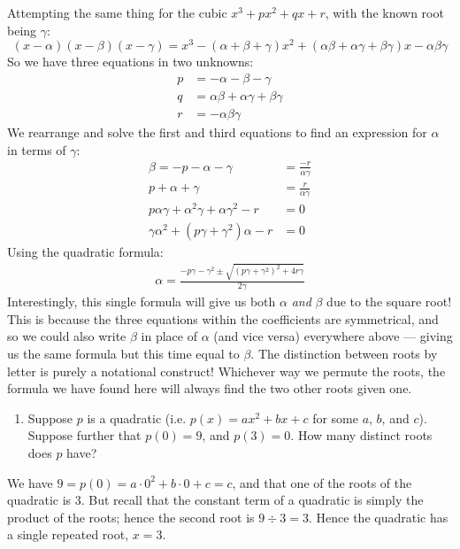 \documentclass[a4paper,10pt]{article}
\newcommand{\answer}{\bfseries\color{Emerald}\refstepcounter{enumi}\item[\theenumi.]}
\begin{document}
Attempting the same thing for the cubic $ x^3 + px^2 + qx + r $, with the known root being $ \gamma $:
\begin{displaymath}
  (x - \alpha)(x - \beta)(x - \gamma) = x^3 - (\alpha + \beta + \gamma)x^2 + (\alpha\beta + \alpha\gamma + \beta\gamma)x - \alpha\beta\gamma
\end{displaymath}
So we have three equations in two unknowns:
\begin{align*}
  p &= -\alpha - \beta - \gamma\\
  q &= \alpha\beta + \alpha\gamma + \beta\gamma\\
  r &= - \alpha\beta\gamma
\end{align*}
We rearrange and solve the first and third equations to find an expression for $ \alpha $ in terms of
$ \gamma $:
\begin{align*}
  \beta = -p - \alpha - \gamma &= \frac{-r}{\alpha\gamma}\\
  p + \alpha + \gamma &= \frac{r}{\alpha\gamma}\\
  p\alpha\gamma + \alpha^2\gamma + \alpha\gamma^2 - r &= 0\\
  \gamma \alpha^2 + (p\gamma + \gamma^2)\alpha - r &= 0
\end{align*}
Using the quadratic formula:
\begin{align*}
  \alpha = \frac{-p\gamma-\gamma^2 \pm \sqrt{(p\gamma + \gamma^2)^2 + 4r\gamma}}{2\gamma}
\end{align*}
Interestingly, this single formula will give us both $ \alpha $ \textit{and} $ \beta $ due
to the square root! This is because the three equations within the coefficients are symmetrical,
and so we could also write $ \beta $ in place of $ \alpha $ (and vice versa) everywhere above ---
giving us the same formula but this time equal to $ \beta $. The distinction between roots by letter
is purely a notational construct! Whichever way we permute the roots, the formula we have found
here will always find the two other roots given one.

\filbreak\begin{enumerate}[resume]
  \answer Suppose $ p $ is a quadratic (i.e. $ p(x) = ax^2 + bx + c $ for some $ a $, $ b $, and $ c $). Suppose further
        that $ p(0) = 9 $, and $ p(3) = 0 $. How many distinct roots does $ p $ have?
\end{enumerate}
We have $ 9 = p(0) = a \cdot 0^2 + b \cdot 0 + c = c $, and that one of the roots of the quadratic is 3. But
recall that the constant term of a quadratic is simply the product of the roots; hence the second root is $ 9 \div 3 = 3 $.
Hence the quadratic has a single repeated root, $ x = 3 $.
\end{document}
